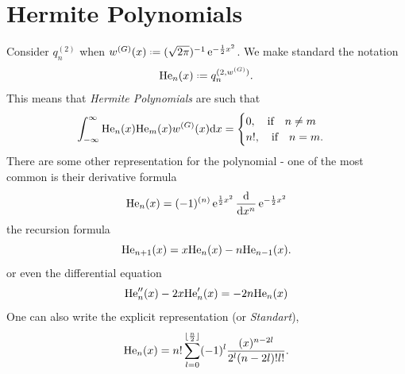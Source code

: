\section{Hermite Polynomials}

Consider $q^{(2)}_n$ when $\wf^{(G)}(x) \deff (\sqrt{2\pi})^{-1} \ee^{-\frac{1}{2} x^2}$. We make standard the notation
\begin{equation}
	\He_n(x) \deff q^{(2,\wf^{(G)})}_n.
\end{equation}
This means that \textit{Hermite Polynomials} are such that
\begin{equation}
	\int_{-\infty}^{\infty} \mathrm{He}_n(x) \mathrm{He}_m(x) w^{(G)}(x) \mathrm{d} x = 
	\begin{cases}
		0, \quad \text{if} \quad n \neq m \\
		n!, \quad \text{if} \quad n = m.
	\end{cases}
\end{equation}
There are some other representation for the polynomial - one of the most common is their derivative formula
\begin{equation}
	\mathrm{He}_n(x) = (-1)^{(n)}\operatorname{e}^{\frac{1}{2} x^2} \frac{\mathrm{d}}{\mathrm{d} x^n} \operatorname{e}^{-\frac{1}{2} x^2}
\end{equation}
the recursion formula 
\begin{equation}
	\mathrm{He}_{n+1}(x) = x \mathrm{He}_n(x) - n \mathrm{He}_{n-1}(x).
\end{equation}
or even the differential equation
\begin{equation}
	\mathrm{He}''_n(x) - 2 x \mathrm{He}'_n(x) = -2 n \mathrm{He}_n(x)
	\label{Equation: Differential equation}
\end{equation}
One can also write the explicit representation (or \textit{Standart}),
\begin{equation}
	\mathrm{He}_{n}(x) = n! \sum_{l=0}^{\lfloor \frac{n}{2} \rfloor} (-1)^{l} \frac{(x)^{n-2l}}{2^l (n-2l)! l!}.
	\label{Equation: Standart Hermite Notation}
\end{equation}

